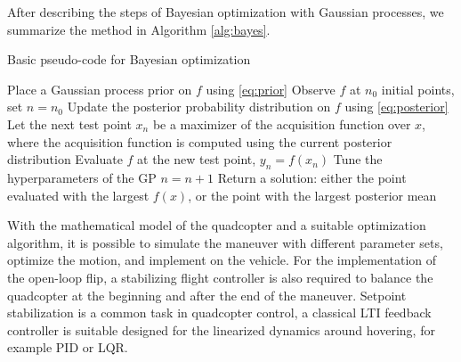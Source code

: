 After describing the steps of Bayesian optimization with Gaussian processes, we summarize the method in Algorithm \ref{alg:bayes}.
\begin{algorithm}
\caption{Basic pseudo-code for Bayesian optimization \cite{frazier2018tutorial}}
\label{alg:bayes}
\begin{algorithmic}[1]
	\State Place a Gaussian process prior on $f$ using \eqref{eq:prior}
    \State Observe $f$ at $n_0$ initial points, set $n=n_0$
    \State Update the posterior probability distribution on $f$ using \eqref{eq:posterior}
    \State Let the next test point $x_n$ be a maximizer of the acquisition function over $x$, where the acquisition function is computed using the current posterior distribution
    \State Evaluate $f$ at the new test point, $y_n = f(x_n)$
    \State Tune the hyperparameters of the GP
    \State $n=n+1$
	\EndWhile
	\State Return a solution: either the point evaluated with the largest $f(x)$, or the point with the largest posterior mean
\end{algorithmic}
\end{algorithm}




With the mathematical model of the quadcopter and a suitable optimization algorithm, it is possible to simulate the maneuver with different parameter sets, optimize the motion, and implement on the vehicle. For the implementation of the open-loop flip, a stabilizing flight controller is also required to balance the quadcopter at the beginning and after the end of the maneuver. Setpoint stabilization is a common task in quadcopter control, a classical LTI feedback controller is suitable designed for the linearized dynamics around hovering, for example PID or LQR\footnotemark.

